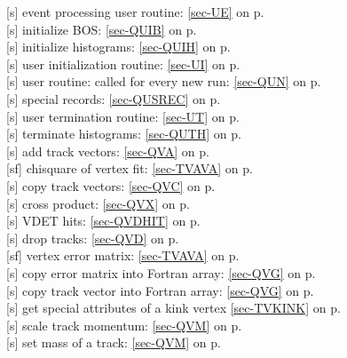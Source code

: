  [s] event processing user routine:
 \ref{sec-UE} on p.~\pageref{sec-UE}\\
 [s] initialize BOS: \ref{sec-QUIB} on p.~\pageref{sec-QUIB}\\
 [s] initialize histograms: \ref{sec-QUIH} on p.~\pageref{sec-QUIH}\\
 [s] user initialization routine:
 \ref{sec-UI} on p.~\pageref{sec-UI}\\
 [s] user routine: called for every new run:
 \ref{sec-QUN} on p.~\pageref{sec-QUN}\\
 [s] special records: \ref{sec-QUSREC} on p.~\pageref{sec-QUSREC}\\
 [s] user termination routine:
 \ref{sec-UT} on p.~\pageref{sec-UT}\\
 [s] terminate histograms: \ref{sec-QUTH} on p.~\pageref{sec-QUTH} \\
 [s] add track vectors: \ref{sec-QVA} on p.~\pageref{sec-QVA}\\
 [sf] chisquare of vertex fit: \ref{sec-TVAVA} on p.~\pageref{sec-TVAVA}\\
 [s] copy track vectors: \ref{sec-QVC} on p.~\pageref{sec-QVC}\\
 [s] cross product: \ref{sec-QVX} on p.~\pageref{sec-QVX}\\
 [s] VDET hits: \ref{sec-QVDHIT} on p.~\pageref{sec-QVDHIT}\\
 [s] drop tracks: \ref{sec-QVD} on p.~\pageref{sec-QVD}\\
 [sf] vertex error matrix: \ref{sec-TVAVA} on p.~\pageref{sec-TVAVA}\\
 [s] copy error matrix into Fortran array:
 \ref{sec-QVG} on p.~\pageref{sec-QVG}\\
 [s] copy track vector into Fortran array:
 \ref{sec-QVG} on p.~\pageref{sec-QVG}\\
 [s] get special attributes of a kink vertex \ref{sec-TVKINK} on p.~\pageref{sec-TVKINK}\\
 [s] scale track momentum: \ref{sec-QVM} on p.~\pageref{sec-QVM}\\
 [s] set mass of a track: \ref{sec-QVM} on p.~\pageref{sec-QVM}\\
